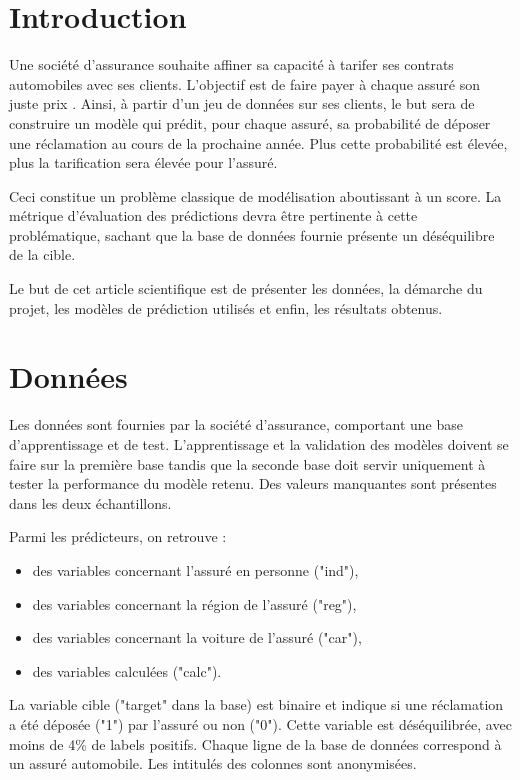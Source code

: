 \documentclass[french]{article}
\begin{document}
\begin{multicols}{2}
\section{Introduction}


Une société d'assurance souhaite affiner sa capacité à tarifer ses contrats automobiles avec ses clients. L'objectif est de faire payer à chaque assuré son \og juste prix \fg{}. Ainsi, à partir d'un jeu de données sur ses clients, le but sera de construire un modèle qui prédit, pour chaque assuré, sa probabilité de déposer une réclamation au cours de la prochaine année. Plus cette probabilité est élevée, plus la tarification sera élevée pour l'assuré.


Ceci constitue un problème classique de modélisation aboutissant à un score. La métrique d'évaluation des prédictions devra être pertinente à cette problématique, sachant que la base de données fournie présente un déséquilibre de la cible.

Le but de cet article scientifique est de présenter les données, la démarche du projet, les modèles de prédiction utilisés et enfin, les résultats obtenus.

\section{Données}

Les données sont fournies par la société d'assurance, comportant une base d'apprentissage et de test. L'apprentissage et la validation des modèles doivent se faire sur la première base tandis que la seconde base doit servir uniquement à tester la performance du modèle retenu. Des valeurs manquantes sont présentes dans les deux échantillons.

Parmi les prédicteurs, on retrouve :
\begin{itemize}
    \item des variables concernant l'assuré en personne ("ind"),
    \item des variables concernant la région de l'assuré ("reg"),
    \item des variables concernant la voiture de l'assuré ("car"),
    \item des variables calculées ("calc").
\end{itemize}

La variable cible ("target" dans la base) est binaire et indique si une réclamation a été déposée ("1") par l'assuré ou non ("0"). Cette variable est déséquilibrée, avec moins de 4\% de labels positifs. Chaque ligne de la base de données correspond à un assuré automobile. Les intitulés des colonnes sont anonymisées.




\end{multicols}
\end{document}
